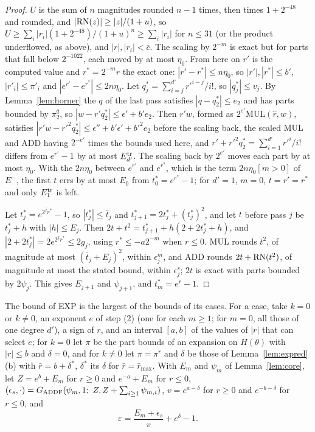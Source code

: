 \begin{proof}
$U$ is the sum of $n$ magnitudes rounded $n - 1$ times, then times $1 + 2^{-48}$ and rounded, and $|\mathrm{RN}(z)| \ge
|z|/(1+u)$, so $U \ge \sum_i|r_i|(1 + 2^{-48})/(1+u)^n \ge \sum_i|r_i|$ for $n \le 31$ (or the product underflowed, as
above), and $|r|, |r_i| < \bar c$. The scaling by $2^{-m}$ is exact but for parts that fall below $2^{-1022}$, each
moved by at most $\eta_0$. From here on $r'$ is the computed value and $r^* = 2^{-m}r$ the exact one: $|r' - r^*| \le
n\eta_0$, so $|r'|, |r^*| \le b'$, $|r'_i| \le \pi'_i$ and $|e^{r'} - e^{r^*}| \le 2n\eta_0$. Let $q^*_j =
\sum_{i=j}^{d'} r'^{i-j}/i!$, so $|q^*_j| \le v_j$.
By Lemma~\ref{lem:horner} the $q$ of the last pass satisfies $|q - q^*_2| \le e_2$ and has parts bounded by $\pi^q_2$,
so $|w - r'q^*_2| \le \epsilon' + b'e_2$. Then $r'w$, formed as $2^{e'}\mathrm{MUL}(\hat r,
w)$, satisfies $|r'w - r'^2q^*_2| \le \epsilon'' + b'\epsilon' + b'^2e_2$ before the scaling back, the scaled MUL and ADD
having $2^{-e'}$ times the bounds used here, and $r' + r'^2q^*_2 = \sum_{i=1}^{d'}r'^i/i!$ differs from $e^{r'} - 1$ by at
most $E^{\rm tr}_{d'}$. The scaling back by $2^{e'}$ moves each part by at most $\eta_0$. With the $2n\eta_0$ between $e^{r'}$ and
$e^{r^*}$, which is the term $2n\eta_0[m > 0]$ of $E^-$, the first $t$ errs by at most $E_0$ from $t^*_0 = e^{r^*} -
1$; for $d' = 1$, $m = 0$, $t = r' = r^*$ and only $E^{\rm tr}_1$ is left.

Let $t^*_j = e^{2^jr^*} - 1$, so $|t^*_j| \le \bar t_j$ and $t^*_{j+1} = 2t^*_j + (t^*_j)^2$, and let $t$ before pass $j$ be $t^*_j +
h$ with $|h| \le E_j$. Then $2t + t^2 = t^*_{j+1} + h(2 + 2t^*_j + h)$, and $|2 + 2t^*_j| = 2e^{2^jr^*} \le 2g_j$, using $r^*
\le -a2^{-m}$ when $r \le 0$. MUL rounds $t^2$, of magnitude at most $(\bar t_j + E_j)^2$, within $\epsilon^m_j$, and
ADD rounds $2t + \mathrm{RN}(t^2)$, of magnitude at most the stated bound, within $\epsilon^s_j$; $2t$ is exact with parts
bounded by $2\psi_j$. This gives $E_{j+1}$ and $\psi_{j+1}$, and $t^*_m = e^r - 1$.
\end{proof}

 The bound of EXP is the largest of the bounds of its cases. For a case, take $k = 0$ or $k \ne 0$, an exponent $e$
of step (2) (one for each $m \ge 1$; for $m = 0$, all those of one degree $d'$), a sign of $r$, and an interval
$[a, b]$ of the values of $|r|$ that can select $e$; for $k = 0$ let $\pi$ be the part bounds of an expansion on
$H(\theta)$ with $|r| \le b$ and $\delta = 0$, and for $k \ne 0$ let $\pi = \pi^r$ and $\delta$ be those of
Lemma~\ref{lem:expred}(b) with $\bar r = b + \delta^*$, $\delta^*$ its $\delta$ for $\bar r = \bar r_{\max}$. With $E_m$ and
$\psi_m$ of Lemma~\ref{lem:core}, let $Z = e^b + E_m$ for $r \ge 0$ and $e^{-a} + E_m$ for $r \le 0$,
$(\epsilon_s, \cdot) = G_{\rm ADDF}(\psi_m, 1;\ Z, Z + \sum_{i \ge 1}\psi_{m,i})$, $v = e^{a - \delta}$ for $r \ge 0$
and $e^{-b-\delta}$ for $r \le 0$, and
\[
\varepsilon = \frac{E_m + \epsilon_s}{v} + e^\delta - 1.
\]

